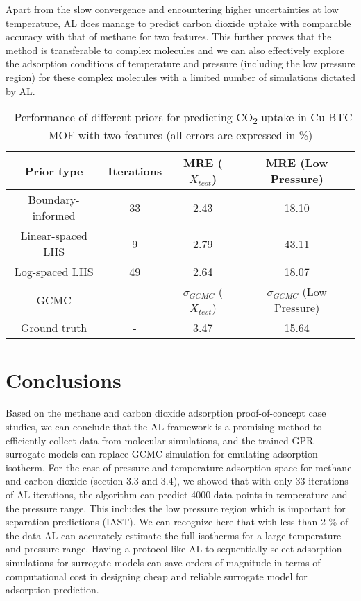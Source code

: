 \documentclass[twoside,twocolumn,9pt]{article}
\begin{document}
Apart from the slow convergence and encountering higher uncertainties at low temperature, AL does manage to predict carbon dioxide uptake with comparable accuracy with that of methane for two features. This further proves that the method is transferable to complex molecules and we can also effectively explore the adsorption conditions of temperature and pressure (including the low pressure region) for these complex molecules with a limited number of simulations dictated by AL.
\begin{table}[ht]
\small
  \caption{\ Performance of different priors for predicting CO\textsubscript{2} uptake in Cu-BTC MOF with two features (all errors are expressed in \%)} 
  \label{tbl:CO2_two_features_Prior}
  \begin{tabular*}{0.48\textwidth}{@{\extracolsep{\fill}}cccc}
    \hline
    Prior type & Iterations & MRE ($X_{test}$) & MRE (Low Pressure)\\
    \hline
    Boundary-informed & 33 & 2.43 & 18.10\\
    Linear-spaced LHS & 9 & 2.79 & 43.11\\
    Log-spaced LHS & 49 & 2.64 & 18.07\\
    \hline
    GCMC & - & $\sigma_{GCMC}$ ($X_{test}$) & $\sigma_{GCMC}$ (Low Pressure)\\ 
    \hline
    Ground truth & - & 3.47 & 15.64\\
    \hline
  \end{tabular*}
\end{table}

\section{Conclusions}
Based on the methane and carbon dioxide adsorption proof-of-concept case studies, we can conclude that the AL framework is a promising method to efficiently collect data from molecular simulations, and the trained GPR surrogate models can replace GCMC simulation for emulating adsorption isotherm. For the case of pressure and temperature adsorption space for methane and carbon dioxide (section 3.3 and 3.4), we showed that with only 33 iterations of AL iterations, the algorithm can predict 4000 data points in temperature and the pressure range. This includes the low pressure region which is important for separation predictions (IAST). We can recognize here that with less than 2 \% of the data AL can accurately estimate the full isotherms for a large temperature and pressure range. Having a protocol like AL to sequentially select adsorption simulations for surrogate models can save orders of magnitude in terms of computational cost in designing cheap and reliable surrogate model for adsorption prediction.
\end{document}

